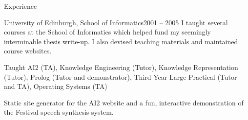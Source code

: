 \documentclass{resume} %
\begin{document}
\begin{rSection}{Experience}
\begin{rSubsection}{University of Edinburgh, School of Informatics}{2001 -- 2005}
{I taught several courses at the School of Informatics which helped fund my seemingly interminable thesis write-up. I also devised teaching materials and maintained course websites.}{}
\item Taught AI2 (TA), Knowledge Engineering (Tutor), Knowledge Representation (Tutor), Prolog (Tutor and demonstrator), Third Year Large Practical (Tutor and TA), Operating Systems (TA)
\item Static site generator for the AI2 website and a fun, interactive demonstration of the Festival speech synthesis system.
\end{rSubsection}

\end{rSection}


\end{document}
